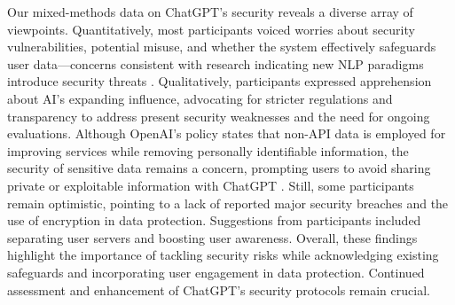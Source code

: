 \documentclass[sigconf]{acmart}
\begin{document}
Our mixed-methods data on ChatGPT’s security reveals a diverse array of viewpoints. Quantitatively, most participants voiced worries about security vulnerabilities, potential misuse, and whether the system effectively safeguards user data—concerns consistent with research indicating new NLP paradigms introduce security threats \cite{shi2023badgpt, 10.1145/3706599.3720152}. Qualitatively, participants expressed apprehension about AI’s expanding influence, advocating for stricter regulations and transparency to address present security weaknesses and the need for ongoing evaluations. Although OpenAI’s policy states that non-API data is employed for improving services while removing personally identifiable information, the security of sensitive data remains a concern, prompting users to avoid sharing private or exploitable information with ChatGPT \cite{derner2023beyond}. Still, some participants remain optimistic, pointing to a lack of reported major security breaches and the use of encryption in data protection. Suggestions from participants included separating user servers and boosting user awareness. Overall, these findings highlight the importance of tackling security risks while acknowledging existing safeguards and incorporating user engagement in data protection. Continued assessment and enhancement of ChatGPT’s security protocols remain crucial.
\end{document}
